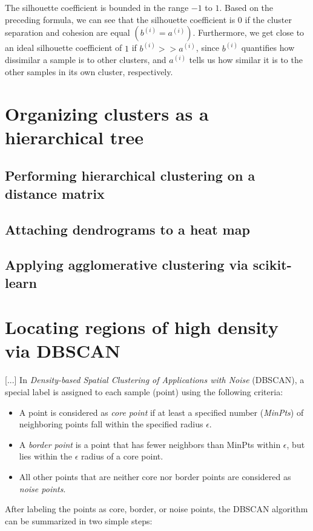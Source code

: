 \documentclass[letterpaper]{report}
\begin{document}
The silhouette coefficient is bounded in the range $-1$ to $1$. Based on the preceding formula, we can see that the silhouette coefficient is 0 if the cluster separation
and cohesion are equal $(b^{(i)} = a^{(i)})$. Furthermore, we get close to an ideal silhouette coefficient of $1$ if $b^{(i)} >> a^{(i)}$, since $b^{(i)}$ quantifies how dissimilar a sample is to other clusters, and $a^{(i)}$ tells us how similar it is to the other samples in its own cluster, respectively.

\section{Organizing clusters as a hierarchical tree}
\subsection{Performing hierarchical clustering on a distance matrix}
\subsection{Attaching dendrograms to a heat map}
\subsection{Applying agglomerative clustering via scikit-learn}
\section{Locating regions of high density via DBSCAN}

[...] In \textit{Density-based Spatial Clustering of Applications with Noise} (DBSCAN), a special label is assigned to each sample (point) using the following criteria:

\begin{itemize}
\item A point is considered as \textit{core point} if at least a specified number (\textit{MinPts}) of neighboring points fall within the specified radius $\epsilon$.
\item A \textit{border point} is a point that has fewer neighbors than MinPts within $\epsilon$, but lies within the $\epsilon$ radius of a core point.
\item All other points that are neither core nor border points are considered as \textit{noise points}.
\end{itemize}

After labeling the points as core, border, or noise points, the DBSCAN algorithm can be summarized in two simple steps:
\end{document}
